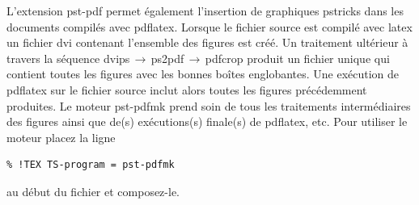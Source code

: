 \documentclass[11pt,french]{article}
\newcommand{\TS}{\textsf{\TeX Shop}}
\newcommand{\latexmk}{\textsf{latexmk}}
\newcommand{\cmd}[1]{\textsf{#1}}
\newcommand{\To}{\,\(\to\)\,}
\begin{document}
L'extension \cmd{pst-pdf} permet également l'insertion de graphiques \cmd{pstricks} dans les documents compilés avec \cmd{pdflatex}. Lorsque le fichier source est compilé avec \cmd{latex} un fichier \cmd{dvi} contenant l'ensemble des figures est créé. Un traitement ultérieur à travers la séquence \cmd{dvips}\To\cmd{ps2pdf}\To\cmd{pdfcrop} produit un fichier unique qui contient toutes les figures avec les bonnes boîtes englobantes. Une exécution de \cmd{pdflatex} sur le fichier source inclut alors toutes les figures précédemment produites. Le moteur \cmd{pst-pdfmk} prend soin de tous les traitements intermédiaires des figures ainsi que de(s) exécutions(s) finale(s) de \cmd{pdflatex}, etc. Pour utiliser le moteur placez la ligne
\begin{verbatim}
% !TEX TS-program = pst-pdfmk
\end{verbatim}
au début du fichier et composez-le. 

%
%
\end{document}
